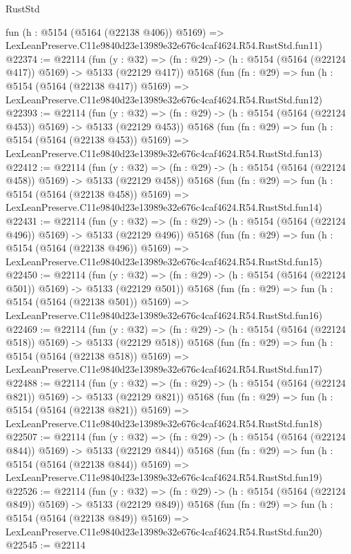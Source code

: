 \begin{lexlean}{RustStd}
\begin{coremodule}
    fun (h : @5154 (@5164 (@22138 @406)) @5169) =>
    LexLeanPreserve.C11e9840d23e13989e32e676c4caf4624.R54.RustStd.fun11)
@22374 := @22114
    (fun (y : @32) => (fn : @29) -> (h : @5154 (@5164 (@22124 @417)) @5169) -> @5133 (@22129 @417))
    @5168
    (fun (fn : @29) =>
    fun (h : @5154 (@5164 (@22138 @417)) @5169) =>
    LexLeanPreserve.C11e9840d23e13989e32e676c4caf4624.R54.RustStd.fun12)
@22393 := @22114
    (fun (y : @32) => (fn : @29) -> (h : @5154 (@5164 (@22124 @453)) @5169) -> @5133 (@22129 @453))
    @5168
    (fun (fn : @29) =>
    fun (h : @5154 (@5164 (@22138 @453)) @5169) =>
    LexLeanPreserve.C11e9840d23e13989e32e676c4caf4624.R54.RustStd.fun13)
@22412 := @22114
    (fun (y : @32) => (fn : @29) -> (h : @5154 (@5164 (@22124 @458)) @5169) -> @5133 (@22129 @458))
    @5168
    (fun (fn : @29) =>
    fun (h : @5154 (@5164 (@22138 @458)) @5169) =>
    LexLeanPreserve.C11e9840d23e13989e32e676c4caf4624.R54.RustStd.fun14)
@22431 := @22114
    (fun (y : @32) => (fn : @29) -> (h : @5154 (@5164 (@22124 @496)) @5169) -> @5133 (@22129 @496))
    @5168
    (fun (fn : @29) =>
    fun (h : @5154 (@5164 (@22138 @496)) @5169) =>
    LexLeanPreserve.C11e9840d23e13989e32e676c4caf4624.R54.RustStd.fun15)
@22450 := @22114
    (fun (y : @32) => (fn : @29) -> (h : @5154 (@5164 (@22124 @501)) @5169) -> @5133 (@22129 @501))
    @5168
    (fun (fn : @29) =>
    fun (h : @5154 (@5164 (@22138 @501)) @5169) =>
    LexLeanPreserve.C11e9840d23e13989e32e676c4caf4624.R54.RustStd.fun16)
@22469 := @22114
    (fun (y : @32) => (fn : @29) -> (h : @5154 (@5164 (@22124 @518)) @5169) -> @5133 (@22129 @518))
    @5168
    (fun (fn : @29) =>
    fun (h : @5154 (@5164 (@22138 @518)) @5169) =>
    LexLeanPreserve.C11e9840d23e13989e32e676c4caf4624.R54.RustStd.fun17)
@22488 := @22114
    (fun (y : @32) => (fn : @29) -> (h : @5154 (@5164 (@22124 @821)) @5169) -> @5133 (@22129 @821))
    @5168
    (fun (fn : @29) =>
    fun (h : @5154 (@5164 (@22138 @821)) @5169) =>
    LexLeanPreserve.C11e9840d23e13989e32e676c4caf4624.R54.RustStd.fun18)
@22507 := @22114
    (fun (y : @32) => (fn : @29) -> (h : @5154 (@5164 (@22124 @844)) @5169) -> @5133 (@22129 @844))
    @5168
    (fun (fn : @29) =>
    fun (h : @5154 (@5164 (@22138 @844)) @5169) =>
    LexLeanPreserve.C11e9840d23e13989e32e676c4caf4624.R54.RustStd.fun19)
@22526 := @22114
    (fun (y : @32) => (fn : @29) -> (h : @5154 (@5164 (@22124 @849)) @5169) -> @5133 (@22129 @849))
    @5168
    (fun (fn : @29) =>
    fun (h : @5154 (@5164 (@22138 @849)) @5169) =>
    LexLeanPreserve.C11e9840d23e13989e32e676c4caf4624.R54.RustStd.fun20)
@22545 := @22114

\end{coremodule}
\end{lexlean}
